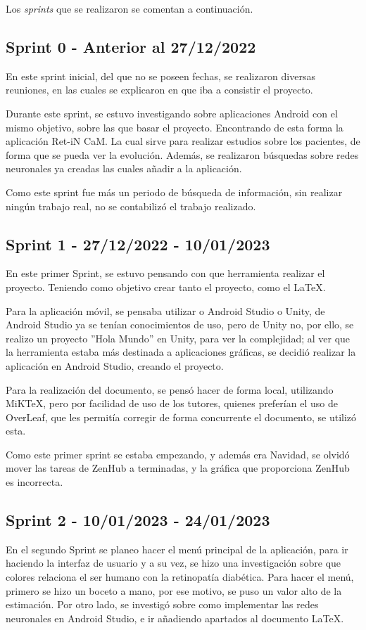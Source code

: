 Los \textit{sprints} que se realizaron se comentan a continuación.

\subsection{Sprint 0 - Anterior al 27/12/2022}
En este sprint inicial, del que no se poseen fechas, se realizaron diversas reuniones, en las cuales se explicaron en que iba a consistir el proyecto.

Durante este sprint, se estuvo investigando sobre aplicaciones Android con el mismo objetivo, sobre las que basar el proyecto. Encontrando de esta forma la aplicación Ret-iN CaM. La cual sirve para realizar estudios sobre los pacientes, de forma que se pueda ver la evolución.
Además, se realizaron búsquedas sobre redes neuronales ya creadas las cuales añadir a la aplicación. 

Como este sprint fue más un periodo de búsqueda de información, sin realizar ningún trabajo real, no se contabilizó el trabajo realizado.
\subsection{Sprint 1 - 27/12/2022 - 10/01/2023}
En este primer Sprint, se estuvo pensando con que herramienta realizar el proyecto. Teniendo como objetivo crear tanto el proyecto, como el LaTeX.

Para la aplicación móvil, se pensaba utilizar o Android Studio o Unity, de Android Studio ya se tenían conocimientos de uso, pero de Unity no, por ello, se realizo un proyecto ''Hola Mundo'' en Unity, para ver la complejidad; al ver que la herramienta estaba más destinada a aplicaciones gráficas, se decidió realizar la aplicación en Android Studio, creando el proyecto.

Para la realización del documento, se pensó hacer de forma local, utilizando MiKTeX, pero por facilidad de uso de los tutores, quienes preferían el uso de OverLeaf, que les permitía corregir de forma concurrente el documento, se utilizó esta.

Como este primer sprint se estaba empezando, y además era Navidad, se olvidó mover las tareas de ZenHub a terminadas, y la gráfica que proporciona ZenHub es incorrecta. 

\subsection{Sprint 2 - 10/01/2023 - 24/01/2023}
En el segundo Sprint se planeo hacer el menú principal de la aplicación, para ir haciendo la interfaz de usuario y a su vez, se hizo una investigación sobre que colores relaciona el ser humano con la retinopatía diabética.
Para hacer el menú, primero se hizo un boceto a mano, por ese motivo, se puso un valor alto de la estimación.
Por otro lado, se investigó sobre como implementar las redes neuronales en Android Studio, e ir añadiendo apartados al documento LaTeX.

